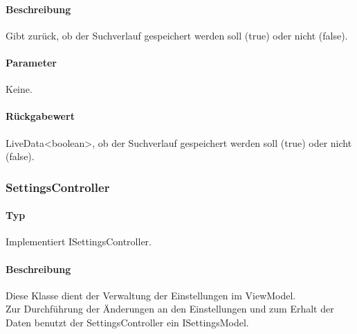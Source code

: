 \paragraph*{Beschreibung}
Gibt zurück, ob der Suchverlauf gespeichert werden soll (true) oder nicht (false).
\paragraph*{Parameter}
Keine.
\paragraph*{Rückgabewert}
LiveData<boolean>, ob der Suchverlauf gespeichert werden soll (true) oder nicht (false).

\subsubsection{SettingsController}
\paragraph*{Typ}
Implementiert ISettingsController.
\paragraph*{Beschreibung}
Diese Klasse dient der Verwaltung der Einstellungen im ViewModel. \\
Zur Durchführung der Änderungen an den Einstellungen und zum Erhalt der Daten benutzt der SettingsController ein ISettingsModel.
